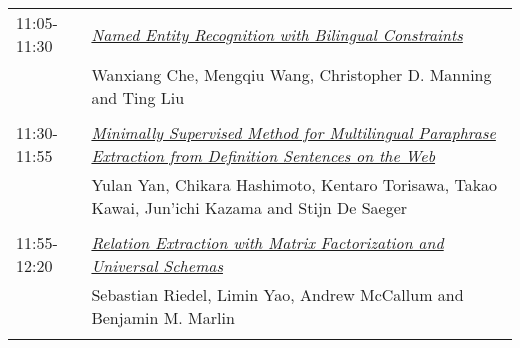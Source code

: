 \begin{tabular}{p{20mm}p{128mm}}
11:05-11:30 & \hyperlink{page.52}{\em Named Entity Recognition with Bilingual Constraints}\\
         & Wanxiang Che, Mengqiu Wang, Christopher D. Manning and Ting Liu \\
\\

11:30-11:55 & \hyperlink{page.63}{\em Minimally Supervised Method for Multilingual Paraphrase Extraction from Definition Sentences on the Web}\\
         & Yulan Yan, Chikara Hashimoto, Kentaro Torisawa, Takao Kawai, Jun'ichi Kazama and Stijn De Saeger \\
\\

11:55-12:20 & \hyperlink{page.74}{\em Relation Extraction with Matrix Factorization and Universal Schemas}\\
         & Sebastian Riedel, Limin Yao, Andrew McCallum and Benjamin M. Marlin \\
\\

\end{tabular}
\newpage
